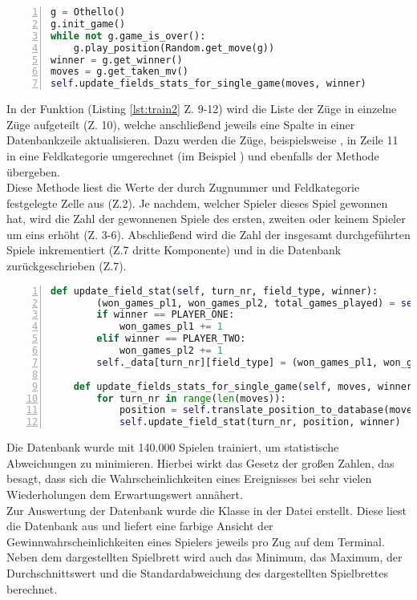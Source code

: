 \begin{lstlisting}[caption = {Befüllen der Datenbank 1}, language = python, captionpos = t , numbers=left, label={lst:train1}]
g = Othello()
g.init_game()
while not g.game_is_over():
	g.play_position(Random.get_move(g))
winner = g.get_winner()
moves = g.get_taken_mv()
self.update_fields_stats_for_single_game(moves, winner)
\end{lstlisting}
In der Funktion  (Listing \ref{lst:train2} Z. 9-12) wird die Liste der Züge in einzelne Züge aufgeteilt (Z. 10), welche anschließend jeweils eine Spalte in einer Datenbankzeile aktualisieren. Dazu werden die Züge, beispielsweise , in Zeile 11 in eine Feldkategorie umgerechnet (im Beispiel ) und ebenfalls der Methode  übergeben.
\\Diese Methode liest die Werte der durch Zugnummer und Feldkategorie festgelegte Zelle aus (Z.2). Je nachdem, welcher Spieler dieses Spiel gewonnen hat, wird die Zahl der gewonnenen Spiele des ersten, zweiten oder keinem Spieler um eins erhöht (Z. 3-6). Abschließend wird die Zahl der insgesamt durchgeführten Spiele inkrementiert (Z.7 dritte Komponente) und in die Datenbank zurückgeschrieben (Z.7).

\begin{lstlisting}[caption = {Befüllen der Datenbank 2}, language = python, captionpos = t , numbers=left, label={lst:train2}]
	def update_field_stat(self, turn_nr, field_type, winner):
		(won_games_pl1, won_games_pl2, total_games_played) = self._data[turn_nr][field_type]
		if winner == PLAYER_ONE:
			won_games_pl1 += 1
		elif winner == PLAYER_TWO:
			won_games_pl2 += 1
		self._data[turn_nr][field_type] = (won_games_pl1, won_games_pl2, total_games_played + 1)

	def update_fields_stats_for_single_game(self, moves, winner):
		for turn_nr in range(len(moves)):
			position = self.translate_position_to_database(moves[turn_nr])
			self.update_field_stat(turn_nr, position, winner)
\end{lstlisting}
Die Datenbank wurde mit 140.000 Spielen trainiert, um statistische Abweichungen zu minimieren. Hierbei wirkt das Gesetz der großen Zahlen, das besagt, dass sich die Wahrscheinlichkeiten eines Ereignisses bei sehr vielen Wiederholungen dem Erwartungswert annähert.
\\Zur Auswertung der Datenbank wurde die Klasse  in der Datei  erstellt. Diese liest die Datenbank aus und liefert eine farbige Ansicht der Gewinnwahrscheinlichkeiten eines Spielers jeweils pro Zug auf dem Terminal. Neben dem dargestellten Spielbrett wird auch das Minimum, das Maximum, der Durchschnittswert und die Standardabweichung des dargestellten Spielbrettes berechnet.
